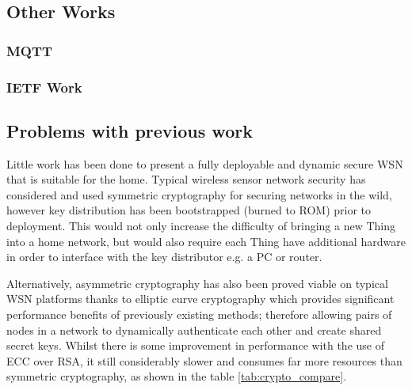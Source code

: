 \documentclass{mprop}
\begin{document}


\subsection{Other Works} %
\label{sub:other_works}
\subsubsection{MQTT} %
\label{ssub:mqtt}

\subsubsection{IETF Work} %
\label{ssub:ietf_work}
\cite{IETF_COAP_HTTP, IETF_CORE}

\subsection{Problems with previous work} %
\label{sub:problems_with_previous_work}

Little work has been done to present a fully deployable and dynamic secure WSN that is suitable for the home. Typical wireless sensor network security has considered and used symmetric cryptography\cite{TinySec,MiniSec, ContikiSec} for securing networks in the wild, however key distribution has been bootstrapped (burned to ROM) prior to deployment. This would not only increase the difficulty of bringing a new Thing into a home network, but would also require each Thing have additional hardware in order to interface with the key distributor e.g. a PC or router. 

Alternatively, asymmetric cryptography has also been proved viable on typical WSN platforms thanks to elliptic curve cryptography which provides significant performance benefits of previously existing methods\cite{TinyECC}; therefore allowing pairs of nodes in a network to dynamically authenticate each other and create shared secret keys. Whilst there is some improvement in performance with the use of ECC over RSA, it still considerably slower and consumes far more resources than symmetric cryptography, as shown in the table \ref{tab:crypto_compare}.
\end{document}
